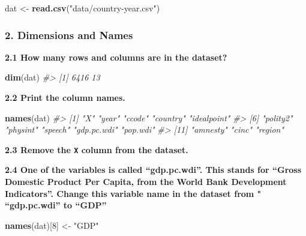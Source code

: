 \documentclass[]{book}
\newenvironment{Shaded}{\begin{snugshade}}{\end{snugshade}}
\newcommand{\KeywordTok}[1]{\textcolor[rgb]{0.13,0.29,0.53}{\textbf{#1}}}
\newcommand{\DecValTok}[1]{\textcolor[rgb]{0.00,0.00,0.81}{#1}}
\newcommand{\StringTok}[1]{\textcolor[rgb]{0.31,0.60,0.02}{#1}}
\newcommand{\CommentTok}[1]{\textcolor[rgb]{0.56,0.35,0.01}{\textit{#1}}}
\newcommand{\OtherTok}[1]{\textcolor[rgb]{0.56,0.35,0.01}{#1}}
\newcommand{\OperatorTok}[1]{\textcolor[rgb]{0.81,0.36,0.00}{\textbf{#1}}}
\newcommand{\NormalTok}[1]{#1}
\begin{document}
\begin{Shaded}
\begin{Highlighting}[]
\NormalTok{dat <-}\StringTok{ }\KeywordTok{read.csv}\NormalTok{(}\StringTok{"data/country-year.csv"}\NormalTok{)}
\end{Highlighting}
\end{Shaded}

\subsubsection*{2. Dimensions and Names}\label{dimensions-and-names}

\textbf{2.1 How many rows and columns are in the dataset?}

\begin{Shaded}
\begin{Highlighting}[]
\KeywordTok{dim}\NormalTok{(dat)}
\CommentTok{#> [1] 6416   13}
\end{Highlighting}
\end{Shaded}

\textbf{2.2 Print the column names.}

\begin{Shaded}
\begin{Highlighting}[]
\KeywordTok{names}\NormalTok{(dat)}
\CommentTok{#>  [1] "X"          "year"       "ccode"      "country"    "idealpoint"}
\CommentTok{#>  [6] "polity2"    "physint"    "speech"     "gdp.pc.wdi" "pop.wdi"   }
\CommentTok{#> [11] "amnesty"    "cinc"       "region"}
\end{Highlighting}
\end{Shaded}

\textbf{2.3 Remove the \texttt{X} column from the dataset.}

\begin{Shaded}
\end{Shaded}

\textbf{2.4 One of the variables is called ``gdp.pc.wdi''. This stands
for ``Gross Domestic Product Per Capita, from the World Bank Development
Indicators''. Change this variable name in the dataset from "
``gdp.pc.wdi'' to ``GDP''}

\begin{Shaded}
\begin{Highlighting}[]
\KeywordTok{names}\NormalTok{(dat)[}\DecValTok{8}\NormalTok{] <-}\StringTok{ "GDP"}
\end{Highlighting}
\end{Shaded}
\end{document}
